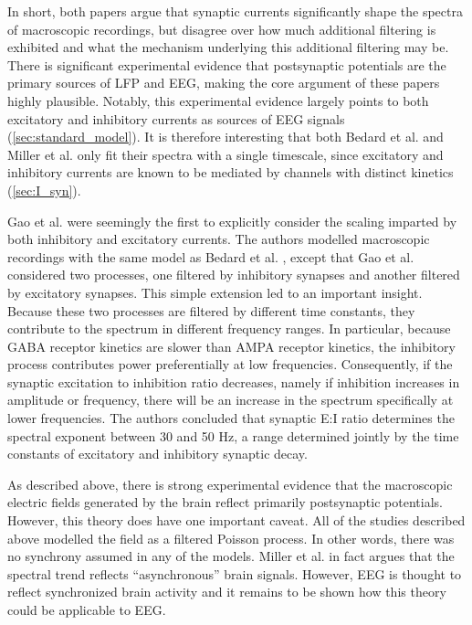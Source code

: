 In short, both papers argue that synaptic currents significantly shape the spectra of macroscopic recordings, but disagree over how much additional filtering is exhibited and what the mechanism underlying this additional filtering may be. There is significant experimental evidence that postsynaptic potentials are the primary sources of LFP and EEG, making the core argument of these papers highly plausible. Notably, this experimental evidence largely points to both excitatory and inhibitory currents as sources of EEG signals (\autoref{sec:standard_model}). It is therefore interesting that both Bedard et al. and Miller et al. only fit their spectra with a single timescale, since excitatory and inhibitory currents are known to be mediated by channels with distinct kinetics (\autoref{sec:I_syn}).

Gao et al. \cite{Gao2017} were seemingly the first to explicitly consider the scaling imparted by both inhibitory and excitatory currents. The authors modelled macroscopic recordings with the same model as Bedard et al. \cite{Bedard2006}, except that Gao et al. considered two processes, one filtered by inhibitory synapses and another filtered by excitatory synapses. This simple extension led to an important insight. Because these two processes are filtered by different time constants, they contribute to the spectrum in different frequency ranges. In particular, because GABA receptor kinetics are slower than AMPA receptor kinetics, the inhibitory process contributes power preferentially at low frequencies. Consequently, if the synaptic excitation to inhibition ratio decreases, namely if inhibition increases in amplitude or frequency, there will be an increase in the spectrum specifically at lower frequencies. The authors concluded that synaptic E:I ratio determines the spectral exponent between 30 and 50 Hz, a range determined jointly by the time constants of excitatory and inhibitory synaptic decay. 

As described above, there is strong experimental evidence that the macroscopic electric fields generated by the brain reflect primarily postsynaptic potentials. However, this theory does have one important caveat. All of the studies described above modelled the field as a filtered Poisson process. In other words, there was no synchrony assumed in any of the models. Miller et al.\cite{Miller2009} in fact argues that the spectral trend reflects ``asynchronous'' brain signals. However, EEG is thought to reflect synchronized brain activity and it remains to be shown how this theory could be applicable to EEG.

